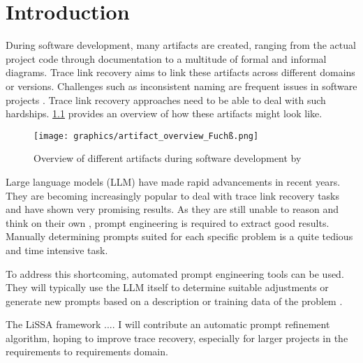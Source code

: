 
\chapter{Introduction}
\label{ch:Introduction}
During software development, many artifacts are created, ranging from the actual project code through documentation to a multitude of formal and informal diagrams. Trace link recovery aims to link these artifacts across different domains or versions. Challenges such as inconsistent naming are frequent issues in software projects \cite{wohlrab2019ImprovingConsistency}. Trace link recovery approaches need to be able to deal with such hardships. \cref{fig:artifact_overview} provides an overview of how these artifacts might look like.

\begin{figure}
    \centering
    \texttt{[image: graphics/artifact\_overview\_Fuchß.png]}
    \caption{Overview of different artifacts during software development by }
    \label{fig:artifact_overview}
\end{figure}

Large language models (LLM) have made rapid advancements in recent years. They are becoming increasingly popular to deal with trace link recovery tasks and have shown very promising results. As they are still unable to reason and think on their own \cite{shojaee2025IllusionThinking}, prompt engineering is required to extract good results. Manually determining prompts suited for each specific problem is a quite tedious and time intensive task. 

To address this shortcoming, automated prompt engineering tools can be used. They will typically use the LLM itself to determine suitable adjustments or generate new prompts based on a description or training data of the problem \cite{ramnath2025SystematicSurvey}.

The LiSSA framework \cite{fuchss2025LiSSAGeneric} ....
I will contribute an automatic prompt refinement algorithm, hoping to improve trace recovery, especially for larger projects in the requirements to requirements domain.
